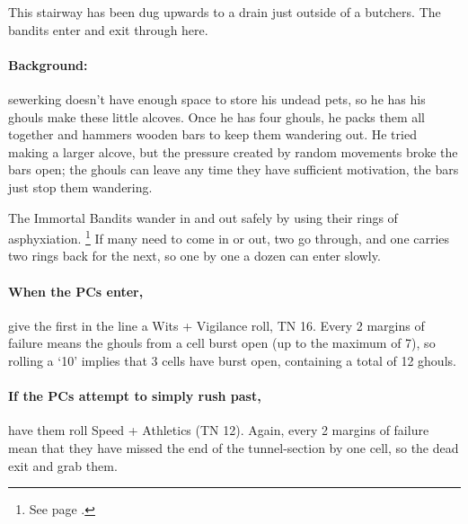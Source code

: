 \begin{multicols}{2}

\label{butcher_exit}

This stairway has been dug upwards to a drain just outside of a butchers.
The bandits enter and exit through here.


\paragraph{Background:}
\Gls{sewerking} doesn't have enough space to store his undead pets, so he has his ghouls make these little alcoves.
Once he has four ghouls, he packs them all together and hammers wooden bars to keep them wandering out.
He tried making a larger alcove, but the pressure created by random movements broke the bars open; the ghouls can leave any time they have sufficient motivation, the bars just stop them wandering.

The Immortal Bandits wander in and out safely by using their rings of asphyxiation.%
\footnote{See page \pageref{ring_asphyxiation}.}
If many need to come in or out, two go through, and one carries two rings back for the next, so one by one a dozen can enter slowly.

\paragraph{When the PCs enter,}
give the first in the line a Wits + Vigilance roll, TN 16.
Every 2 margins of failure means the ghouls from a cell burst open (up to the maximum of 7), so rolling a `10' implies that 3 cells have burst open, containing a total of 12 ghouls.


\paragraph{If the PCs attempt to simply rush past,}
have them roll Speed + Athletics (TN 12).
Again, every 2 margins of failure mean that they have missed the end of the tunnel-section by one cell, so the dead exit and grab them.


\end{multicols}
